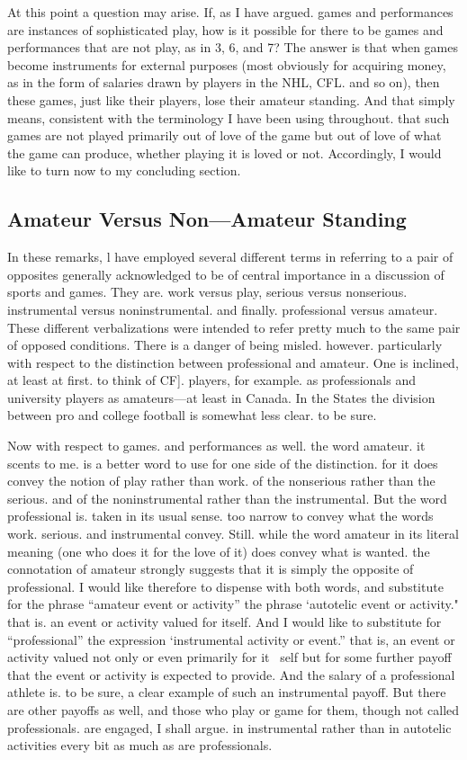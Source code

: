 \documentclass{tufte-handout}
\begin{document}
At this point a question may arise. If, as I have argued. games and performances are instances of sophisticated play, how is it possible for there to be games and performances that are not play, as in 3, 6, and 7? The answer is that when games become instruments for external purposes (most obviously for acquiring money, as in the form of salaries drawn by players in the NHL, CFL. and so on), then these games, just like their players, lose their amateur standing. And that simply means, consistent with the terminology I have been using throughout. that such games are not played primarily out of love of the game but out of love of what the game can produce, whether playing it is loved or not. Accordingly, I would like to turn now to my concluding section. 

\subsection{Amateur Versus Non—Amateur Standing}

In these remarks, l have employed several different terms in referring to a pair of opposites generally acknowledged to be of central importance in a discussion of sports and games. They are. work versus play, serious versus nonserious. instrumental versus noninstrumental. and finally. professional versus amateur. These different verbalizations were intended to refer pretty much to the same pair of opposed conditions. There is a danger of being misled. however. particularly with respect to the distinction between professional and amateur. One is inclined, at least at first. to think of CF]. players, for example. as professionals and university players as amateurs—at least in Canada. In the States the division between pro and college football is somewhat less clear. to be sure. 

Now with respect to games. and performances as well. the word amateur. it scents to me. is a better word to use for one side of the distinction. for it does convey the notion of play rather than work. of the nonserious rather than the serious. and of the noninstrumental rather than the instrumental. But the word professional is. taken in its usual sense. too narrow to convey what the words work. serious. and instrumental convey. Still. while the word amateur in its literal meaning (one who does it for the love of it) does convey what is wanted. the connotation of amateur strongly suggests that it is simply the opposite of professional. I would like therefore to dispense with both words, and substitute for the phrase “amateur event or activity” the phrase ‘autotelic event or activity." that is. an event or activity valued for itself. And I would like to substitute for “professional” the expression ‘instrumental activity or event.” that is, an event or activity valued not only or even primarily for it~ self but for some further payoff that the event or activity is expected to provide. And the salary of a professional athlete is. to be sure, a clear example of such an instrumental payoff. But there are other payoffs as well, and those who play or game for them, though not called professionals. are engaged, I shall argue. in instrumental rather than in autotelic activities every bit as much as are professionals. 
\end{document}
